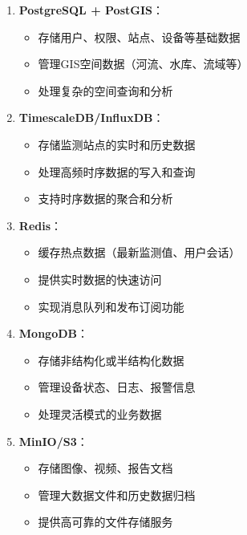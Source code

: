 \begin{enumerate}
\def\labelenumi{\arabic{enumi}.}
\tightlist
\item
  \textbf{PostgreSQL + PostGIS}：

  \begin{itemize}
  \tightlist
  \item
    存储用户、权限、站点、设备等基础数据
  \item
    管理GIS空间数据（河流、水库、流域等）
  \item
    处理复杂的空间查询和分析
  \end{itemize}
\item
  \textbf{TimescaleDB/InfluxDB}：

  \begin{itemize}
  \tightlist
  \item
    存储监测站点的实时和历史数据
  \item
    处理高频时序数据的写入和查询
  \item
    支持时序数据的聚合和分析
  \end{itemize}
\item
  \textbf{Redis}：

  \begin{itemize}
  \tightlist
  \item
    缓存热点数据（最新监测值、用户会话）
  \item
    提供实时数据的快速访问
  \item
    实现消息队列和发布订阅功能
  \end{itemize}
\item
  \textbf{MongoDB}：

  \begin{itemize}
  \tightlist
  \item
    存储非结构化或半结构化数据
  \item
    管理设备状态、日志、报警信息
  \item
    处理灵活模式的业务数据
  \end{itemize}
\item
  \textbf{MinIO/S3}：

  \begin{itemize}
  \tightlist
  \item
    存储图像、视频、报告文档
  \item
    管理大数据文件和历史数据归档
  \item
    提供高可靠的文件存储服务
  \end{itemize}
\end{enumerate}

